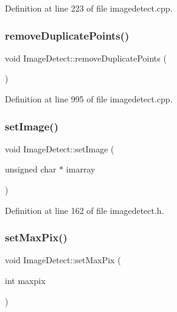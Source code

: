 Definition at line 223 of file imagedetect.\+cpp.

\mbox{\label{class_image_detect_a9541c02a480030211d7e5089f80634e0}} 
\subsubsection{\texorpdfstring{removeDuplicatePoints()}{removeDuplicatePoints()}}
{\footnotesize\ttfamily void Image\+Detect\+::remove\+Duplicate\+Points (\begin{DoxyParamCaption}{ }\end{DoxyParamCaption})}



Definition at line 995 of file imagedetect.\+cpp.

\mbox{\label{class_image_detect_a02ed47fccf8c8a00263d3c246d025626}} 
\subsubsection{\texorpdfstring{setImage()}{setImage()}}
{\footnotesize\ttfamily void Image\+Detect\+::set\+Image (\begin{DoxyParamCaption}\item[{unsigned char $\ast$}]{imarray }\end{DoxyParamCaption})\hspace{0.3cm}{\ttfamily [inline]}}



Definition at line 162 of file imagedetect.\+h.

\mbox{\label{class_image_detect_a9dda32888b1d56cf47d13e2e195254b2}} 
\subsubsection{\texorpdfstring{setMaxPix()}{setMaxPix()}}
{\footnotesize\ttfamily void Image\+Detect\+::set\+Max\+Pix (\begin{DoxyParamCaption}\item[{int}]{maxpix }\end{DoxyParamCaption})\hspace{0.3cm}{\ttfamily [inline]}}



